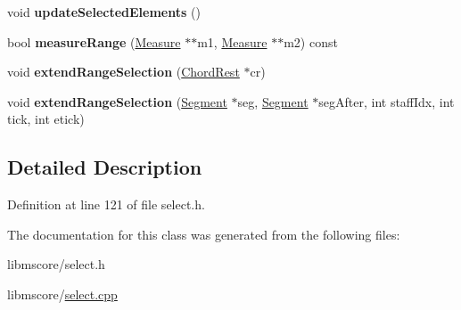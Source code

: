 \begin{DoxyCompactItemize}
void {\bfseries update\+Selected\+Elements} ()
\item 
\mbox{\label{class_ms_1_1_selection_aa8f7f63c5dc2fb6f1d52d3338481a451}} 
bool {\bfseries measure\+Range} (\hyperlink{class_ms_1_1_measure}{Measure} $\ast$$\ast$m1, \hyperlink{class_ms_1_1_measure}{Measure} $\ast$$\ast$m2) const
\item 
\mbox{\label{class_ms_1_1_selection_a6dbdf3cdd7e7f9dcb99730b9db45657b}} 
void {\bfseries extend\+Range\+Selection} (\hyperlink{class_ms_1_1_chord_rest}{Chord\+Rest} $\ast$cr)
\item 
\mbox{\label{class_ms_1_1_selection_acbe4698d9c25695cf191db7fee0f0dba}} 
void {\bfseries extend\+Range\+Selection} (\hyperlink{class_ms_1_1_segment}{Segment} $\ast$seg, \hyperlink{class_ms_1_1_segment}{Segment} $\ast$seg\+After, int staff\+Idx, int tick, int etick)
\end{DoxyCompactItemize}


\subsection{Detailed Description}


Definition at line 121 of file select.\+h.



The documentation for this class was generated from the following files\+:\begin{DoxyCompactItemize}
\item 
libmscore/select.\+h\item 
libmscore/\hyperlink{select_8cpp}{select.\+cpp}\end{DoxyCompactItemize}
